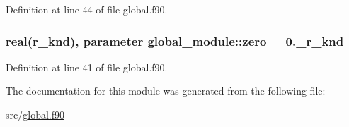 Definition at line 44 of file global.\-f90.

\hypertarget{classglobal__module_aee835b3a70993d265b7592f2485da98a}{
\subsubsection[{zero}]{\setlength{\rightskip}{0pt plus 5cm}real({\bf r\-\_\-knd}), parameter global\-\_\-module\-::zero = 0.\-\_\-r\-\_\-knd}}\label{classglobal__module_aee835b3a70993d265b7592f2485da98a}


Definition at line 41 of file global.\-f90.



The documentation for this module was generated from the following file\-:\begin{DoxyCompactItemize}
\item 
src/\hyperlink{global_8f90}{global.\-f90}\end{DoxyCompactItemize}
